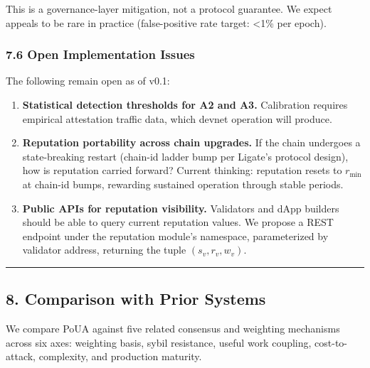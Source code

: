 \documentclass[
  11pt,
]{article}
\providecommand{\tightlist}{%
  \setlength{\itemsep}{0pt}\setlength{\parskip}{0pt}}
\begin{document}
This is a governance-layer mitigation, not a protocol guarantee. We
expect appeals to be rare in practice (false-positive rate target:
\textless1\% per epoch).

\subsubsection{7.6 Open Implementation
Issues}\label{open-implementation-issues}

The following remain open as of v0.1:

\begin{enumerate}
\def\labelenumi{\arabic{enumi}.}
\tightlist
\item
  \textbf{Statistical detection thresholds for A2 and A3.} Calibration
  requires empirical attestation traffic data, which devnet operation
  will produce.
\item
  \textbf{Reputation portability across chain upgrades.} If the chain
  undergoes a state-breaking restart (chain-id ladder bump per Ligate's
  protocol design), how is reputation carried forward? Current thinking:
  reputation resets to \(r_{\min}\) at chain-id bumps, rewarding
  sustained operation through stable periods.
\item
  \textbf{Public APIs for reputation visibility.} Validators and dApp
  builders should be able to query current reputation values. We propose
  a REST endpoint under the reputation module's namespace, parameterized
  by validator address, returning the tuple \((s_v, r_v, w_v)\).
\end{enumerate}

\begin{center}\rule{0.5\linewidth}{0.5pt}\end{center}

\subsection{8. Comparison with Prior
Systems}\label{comparison-with-prior-systems}

We compare PoUA against five related consensus and weighting mechanisms
across six axes: weighting basis, sybil resistance, useful work
coupling, cost-to-attack, complexity, and production maturity.
\end{document}
